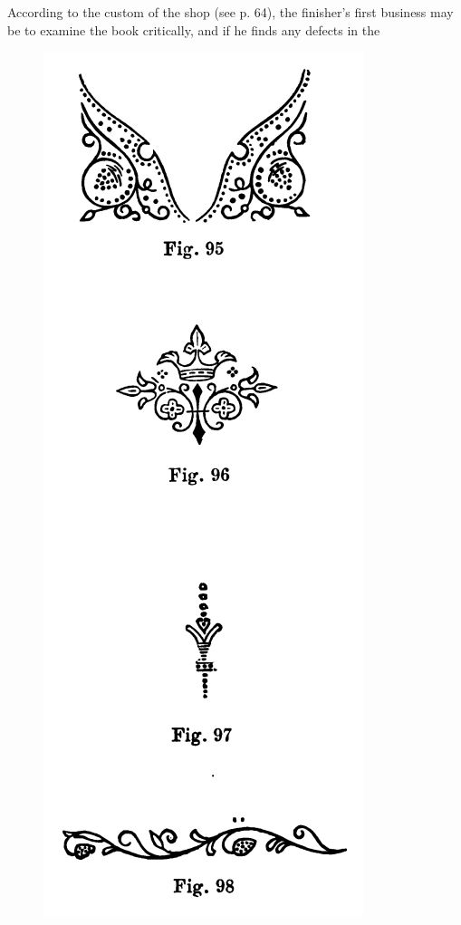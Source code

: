 \documentclass[twoside]{book}
\begin{document}
According to the custom of the shop (see p. 64),
the finisher's first business may be to examine the
book critically, and if he finds any defects in the
\pagebreak
	\vspace*{\fill}
	\begin{figure}[h]
		\centering
		\includegraphics[height=0.6\textheight]{Figures/_095-098.png}

\end{figure}
\end{document}
